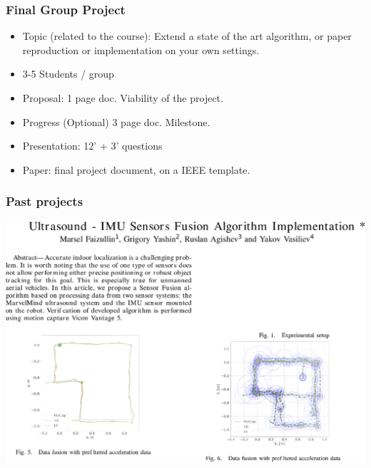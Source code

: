 \documentclass[xetex,mathserif,serif]{beamer} %
\begin{document}
\begin{frame}
\frametitle{Final Group Project}

\begin{itemize}
\item Topic (related to the course): Extend a state of the art algorithm, or paper reproduction or implementation on your own settings.
\item 3-5 Students / group
\item Proposal: 1 page doc. Viability of the project.
\item Progress (Optional) 3 page doc. Milestone.
\item Presentation: 12' + 3' questions
\item Paper: final project document, on a IEEE template.
\end{itemize}

\end{frame}


\begin{frame}
\frametitle{Past projects}

\begin{center}
\includegraphics[width=.95\textwidth]{g1}
\end{center}

\end{frame}
\end{document}
